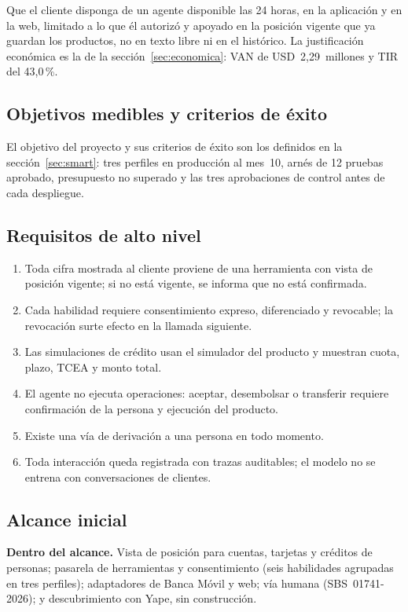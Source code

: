 \documentclass[11pt,a4paper]{article}
\newcommand{\usd}[1]{USD~#1}
\begin{document}
Que el cliente disponga de un agente disponible las 24 horas, en la aplicación y en la web, limitado a lo que él autorizó y apoyado en la posición vigente que ya guardan los productos, no en texto libre ni en el histórico. La justificación económica es la de la sección~\ref{sec:economica}: VAN de \usd{2,29}~millones y TIR del 43,0\,\%.

\subsection{Objetivos medibles y criterios de éxito}

El objetivo del proyecto y sus criterios de éxito son los definidos en la sección~\ref{sec:smart}: tres perfiles en producción al mes~10, arnés de 12 pruebas aprobado, presupuesto no superado y las tres aprobaciones de control antes de cada despliegue.

\subsection{Requisitos de alto nivel}

\begin{enumerate}[label=RQ\arabic*.]
  \item Toda cifra mostrada al cliente proviene de una herramienta con vista de posición vigente; si no está vigente, se informa que no está confirmada.
  \item Cada habilidad requiere consentimiento expreso, diferenciado y revocable; la revocación surte efecto en la llamada siguiente.
  \item Las simulaciones de crédito usan el simulador del producto y muestran cuota, plazo, TCEA y monto total.
  \item El agente no ejecuta operaciones: aceptar, desembolsar o transferir requiere confirmación de la persona y ejecución del producto.
  \item Existe una vía de derivación a una persona en todo momento.
  \item Toda interacción queda registrada con trazas auditables; el modelo no se entrena con conversaciones de clientes.
\end{enumerate}

\subsection{Alcance inicial}\label{sec:alcance}

\textbf{Dentro del alcance.} Vista de posición para cuentas, tarjetas y créditos de personas; pasarela de herramientas y consentimiento (seis habilidades agrupadas en tres perfiles); adaptadores de Banca Móvil y web; vía humana (SBS~01741-2026); y descubrimiento con Yape, sin construcción.
\end{document}
